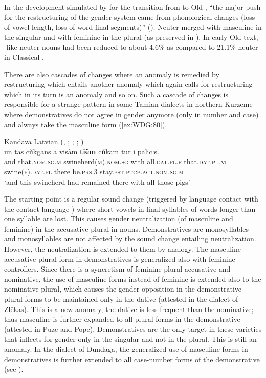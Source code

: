 \documentclass[output=collectionpaper]{langsci/langscibook}
\begin{document}
In the development simulated by \cite{Polinsky2003} for the transition from  to Old , ``the major push for the restructuring of the gender system came from phonological changes (loss of vowel length, loss of word-final segments)'' (\citealt[385]{Polinsky2003}). Neuter merged with masculine in the singular and with feminine in the plural (as preserved in ). In early Old  text, -like neuter nouns had been reduced to about 4.6\% as compared to 21.1\% neuter in Classical .

There are also cascades of changes where an anomaly is remedied by restructuring which entails another anomaly which again calls for restructuring which in its turn is an anomaly and so on. Such a cascade of changes is responsible for a strange pattern in some Tamian  dialects in northern Kurzeme where demonstratives do not agree in gender anymore (only in number and case) and always take the masculine form (\ref{ex:WDG:80}).
\largerpage

\ea\label{ex:WDG:80}
Kandava Latvian (, ; \citealt{Graudina1958}; \citealt[65]{Rudzite1964}; \citealt[144]{Waelchli2018})\\
\gll un	tas	cũkgans	a	\uline{visàm}	\textbf{tiẽm}	\uline{cũkam}	tur	i	palic:s.\\
and	that.\textsc{nom.sg.m}	swineherd\textsc{(m).nom.sg}	with	all.\textsc{dat.pl.\uline{f}}	that.\textsc{dat.pl.\textbf{m}}	swine\textsc{(\uline{f}).dat.pl} there	be.\textsc{prs}.3	stay.\textsc{pst.ptcp.act.nom.sg.m}\\
\glt `and this swineherd had remained there with all those pigs'\\
\z

\newpage 
The starting point is a regular sound change (triggered by language contact with the  contact language ) where short vowels in final syllables of words longer than one syllable are lost. This causes gender neutralization (of masculine and feminine) in the accusative plural in nouns. Demonstratives are monosyllables and monosyllables are not affected by the sound change entailing neutralization. However, the neutralization is extended to them by analogy. The masculine accusative plural form in demonstratives is generalized also with feminine controllers. Since there is a syncretism of feminine plural accusative and nominative, the use of masculine forms instead of feminine is extended also to the nominative plural, which causes the gender opposition in the demonstrative plural forms to be maintained only in the dative (attested in the dialect of Zlēkas). This is a new anomaly, the dative is less frequent than the nominative; thus masculine is further expanded to all plural forms in the demonstrative (attested in Puze and Pope). Demonstratives are the only target in these varieties that inflects for gender only in the singular and not in the plural. This is still an anomaly. In the dialect of Dundaga, the generalized use of masculine forms in demonstratives is further extended to all case-number forms of the demonstrative (see \citealt{Waelchli2017}).
\end{document}
